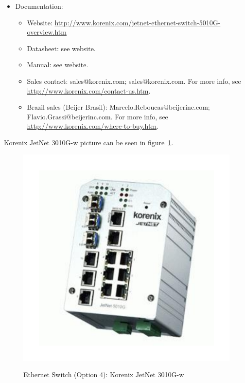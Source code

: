 \begin{itemize}
\begin{itemize}
  \end{itemize}
  \item Documentation:
  \begin{itemize}
    \item Website: \href{http://www.korenix.com/jetnet-ethernet-switch-5010G-overview.htm}{http://www.korenix.com/jetnet-ethernet-switch-5010G-overview.htm}
    \item Datasheet: see website.
    \item Manual: see website.
    \item Sales contact: sales@korenix.com; sales@korenix.com. For more info, see \href{http://www.korenix.com/contact-us.htm}{http://www.korenix.com/contact-us.htm}.
    \item Brazil sales (Beijer Brasil): Marcelo.Reboucas@beijerinc.com; Flavio.Grassi@beijerinc.com. For more info, see \href{http://www.korenix.com/where-to-buy.htm}{http://www.korenix.com/where-to-buy.htm}.
  \end{itemize}
\end{itemize}
Korenix JetNet 3010G-w picture can be seen in figure~\ref{FIG:DEVICESWITCHOPTION4}.
\begin{figure}
  \centering
  \includegraphics[angle=90,width=1\columnwidth]{figs/body02/FIGDEVICESWITCHOPTION4.pdf}\\
  \caption[Ethernet Switch (Option 4): Korenix JetNet 3010G-w]{Ethernet Switch (Option 4): Korenix JetNet 3010G-w}
  \label{FIG:DEVICESWITCHOPTION4}
\end{figure}
